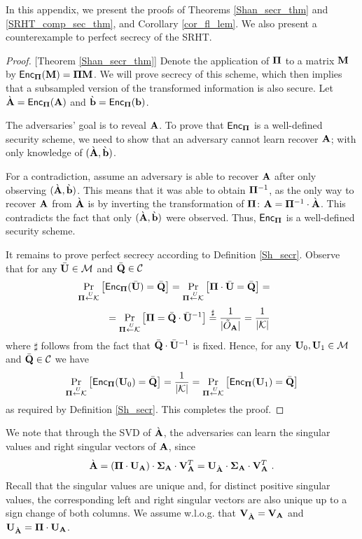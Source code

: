 \documentclass[journal,letterpaper,onecolumn,twoside,nofonttune]{IEEEtran}
\newcommand{\Cc}{\mathcal{C}}
\newcommand{\K}{\mathcal{K}}
\newcommand{\M}{\mathcal{M}}
\newcommand{\Mb}{\bold{M}}
\newcommand{\Qb}{\bold{Q}}
\newcommand{\Otil}{\tilde{O}}
\newcommand{\Ub}{\bold{U}}
\newcommand{\Vb}{\bold{V}}
\newcommand{\Pibold}{\bold{\Pi}}
\newcommand{\Ab}{\bold{A}}
\newcommand{\Abg}{{\grave{\bold{A}}}}
\newcommand{\bb}{\bold{b}}
\newcommand{\bbg}{{\grave{\bold{b}}}}
\newcommand{\Sigb}{\bold{\Sigma}}
\newcommand{\getsU}{\overset{\ U}{\gets}}
\newcommand{\sfsty}[1]{\ensuremath{\mathsf{#1}}}  %
\newcommand{\Enc}{\sfsty{Enc}}
\newcommand{\ind}{\text{\color{white}.$\quad$}}
\begin{document}
In this appendix, we present the proofs of Theorems \ref{Shan_secr_thm} and \ref{SRHT_comp_sec_thm}, and Corollary \ref{cor_fl_lem}. We also present a counterexample to perfect secrecy of the SRHT.

\begin{proof}{[Theorem \ref{Shan_secr_thm}]}
Denote the application of $\Pibold$ to a matrix $\Mb$ by $\Enc_\Pibold(\Mb)=\Pibold\Mb$. We will prove secrecy of this scheme, which then implies that a subsampled version of the transformed information is also secure. Let $\Abg=\Enc_\Pibold(\Ab)$ and $\bbg=\Enc_\Pibold(\bb)$.

The adversaries' goal is to reveal $\Ab$. To prove that $\Enc_\Pibold$ is a well-defined security scheme, we need to show that an adversary cannot learn recover $\Ab$; with only knowledge of $(\Abg,\bbg)$.

For a contradiction, assume an adversary is able to recover $\Ab$ after only observing $(\Abg,\bbg)$. This means that it was able to obtain $\Pibold^{-1}$, as the only way to recover $\Ab$ from $\Abg$ is by inverting the transformation of $\Pibold$: $\Ab=\Pibold^{-1}\cdot\Abg$. This contradicts the fact that only $(\Abg,\bbg)$ were observed. Thus, $\Enc_\Pibold$ is a well-defined security scheme.

It remains to prove perfect secrecy according to Definition \ref{Sh_secr}. Observe that for any $\bar{\Ub}\in\M$ and $\bar{\Qb}\in\Cc$
\begin{equation} \Pr_{\Pibold\getsU\K}\left[\Enc_\Pibold(\bar{\Ub})=\bar{\Qb}\right] = \Pr_{\Pibold\getsU\K}\left[\Pibold\cdot\bar{\Ub}=\bar{\Qb}\right] = \ind \end{equation}
\begin{equation} \ind = \Pr_{\Pibold\getsU\K}\left[\Pibold=\bar{\Qb}\cdot\bar{\Ub}^{-1}\right] \overset{\sharp}{=} \frac{1}{|\Otil_\Ab|} = \frac{1}{|\K|} \end{equation}
where $\sharp$ follows from the fact that $\bar{\Qb}\cdot\bar{\Ub}^{-1}$ is fixed. Hence, for any $\Ub_0,\Ub_1\in\M$ and $\bar{\Qb}\in\Cc$ we have
$$ \Pr_{\Pibold\getsU\K}\left[\Enc_\Pibold(\Ub_0)=\bar{\Qb}\right] = \frac{1}{|\K|} = \Pr_{\Pibold\getsU\K}\left[\Enc_\Pibold(\Ub_1)=\bar{\Qb}\right] $$
as required by Definition \ref{Sh_secr}. This completes the proof.
\end{proof}

We note that through the SVD of $\Abg$, the adversaries can learn the singular values and right singular vectors of $\Ab$, since
\begin{equation}
  \Abg=(\Pibold\cdot\Ub_\Ab)\cdot\Sigb_\Ab\cdot\Vb_\Ab^T=\Ub_\Abg\cdot\Sigb_\Ab\cdot\Vb_\Ab^T \ .
\end{equation}
Recall that the singular values are unique and, for distinct positive singular values, the corresponding left and right singular vectors are also unique up to a sign change of both columns. We assume w.l.o.g. that $\Vb_\Abg=\Vb_\Ab$ and $\Ub_\Abg=\Pibold\cdot\Ub_\Ab$.
\end{document}
